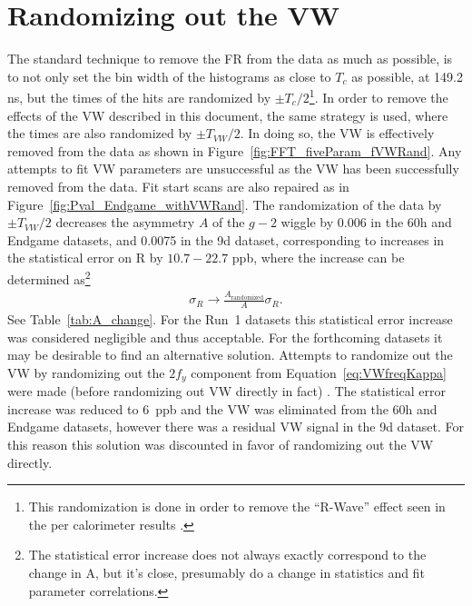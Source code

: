 \documentclass[12pt,letterpaper]{article}
\newcommand{\figref}[1]{Figure~\ref{#1}}
\def\gmtwo{$g-2$\xspace}
\begin{document}
\clearpage

\section{Randomizing out the VW}
\label{sec:randomization}


The standard technique to remove the FR from the data as much as possible, is to not only set the bin width of the histograms as close to $T_{c}$ as possible, at 149.2 ns, but the times of the hits are randomized by $\pm T_{c}/2$\footnote{This randomization is done in order to remove the ``R-Wave'' effect seen in the per calorimeter results \cite{Rwave}.}. In order to remove the effects of the VW described in this document, the same strategy is used, where the times are also randomized by $\pm T_{VW}/2$. In doing so, the VW is effectively removed from the data as shown in \figref{fig:FFT_fiveParam_fVWRand}. Any attempts to fit VW parameters are unsuccessful as the VW has been successfully removed from the data. Fit start scans are also repaired as in \figref{fig:Pval_Endgame_withVWRand}. The randomization of the data by $\pm T_{VW}/2$ decreases the asymmetry $A$ of the \gmtwo wiggle by 0.006 in the 60h and Endgame datasets, and 0.0075 in the 9d dataset, corresponding to increases in the statistical error on R by $10.7 - 22.7$ ppb, where the increase can be determined as\footnote{The statistical error increase does not always exactly correspond to the change in A, but it's close, presumably do a change in statistics and fit parameter correlations.}
    \begin{align}
        \sigma_{R} \rightarrow \frac{ A_{\text{randomized}}}{A}\sigma_{R}.
    \end{align}
See Table~\ref{tab:A_change}. For the Run~1 datasets this statistical error increase was considered negligible and thus acceptable. For the forthcoming datasets it may be desirable to find an alternative solution. Attempts to randomize out the VW by randomizing out the $2f_{y}$ component from Equation~\ref{eq:VWfreqKappa} were made (before randomizing out VW directly in fact) \cite{wa_presentation}. The statistical error increase was reduced to 6~ppb and the VW was eliminated from the 60h and Endgame datasets, however there was a residual VW signal in the 9d dataset. For this reason this solution was discounted in favor of randomizing out the VW directly. 
\end{document}
